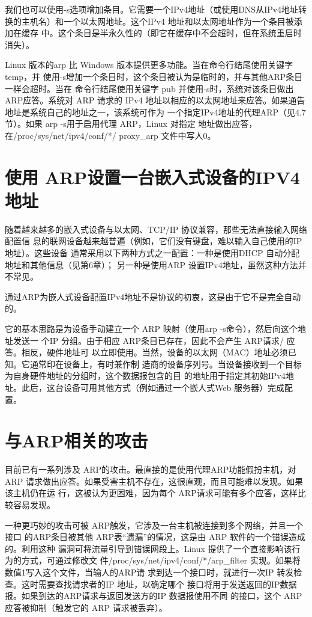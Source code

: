 我们也可以使用-s选项增加条目。它需要一个IPv4地址（或使用DNS从IPv4地址转
换的主机名）和一个以太网地址。这个IPv4 地址和以太网地址作为一个条目被添加在缓存
中。这个条目是半永久性的（即它在缓存中不会超时，但在系统重启时消失）。

Linux 版本的arp 比 Windows 版本提供更多功能。当在命令行结尾使用关键字 temp，并
使用-s增加一个条目时，这个条目被认为是临时的，并与其他ARP条目一样会超时。当在
命令行结尾使用关键字 pub 并使用-s时，系统对该条目做出 ARP应答。系统对 ARP 请求的
IPv4 地址以相应的以太网地址来应答。如果通告地址是系统自己的地址之一，该系统可作为
一个指定IPv4地址的代理ARP（见4.7节）。如果 arp -s用于启用代理 ARP，Linux 对指定
地址做出应答，在/proc/sys/net/ipv4/conf/*/ proxy\_arp 文件中写人0。

\section{使用 ARP设置一台嵌入式设备的IPV4 地址}

随着越来越多的嵌入式设备与以太网、TCP/IP 协议兼容，那些无法直接输入网络配置信
息的联网设备越来越普遍（例如，它们没有键盘，难以输入自己使用的IP地址）。这些设备
通常采用以下两种方式之一配置：一种是使用DHCP 自动分配地址和其他信息（见第6章）；
另一种是使用ARP 设置IPv4地址，虽然这种方法并不常见。

通过ARP为嵌人式设备配置IPv4地址不是协议的初衷，这是由于它不是完全自动的。

它的基本思路是为设备手动建立一个 ARP 映射（使用arp -s命令），然后向这个地址发送一
个IP 分组。由于相应 ARP条目已存在，因此不会产生 ARP请求/ 应答。相反，硬件地址可
以立即使用。当然，设备的以太网（MAC）地址必须已知。它通常印在设备上，有时兼作制
造商的设备序列号。当设备接收到一个目标为自身硬件地址的分组时，这个数据报包含的目
的地址用于指定其初始IPv4地址。此后，这台设备可用其他方式（例如通过一个嵌人式Web
服务器）完成配置。

\section{与ARP相关的攻击}

目前已有一系列涉及 ARP的攻击。最直接的是使用代理ARP功能假扮主机，对ARP
请求做出应答。如果受害主机不存在，这很直观，而且可能难以发现。如果该主机仍在运
行，这被认为更困难，因为每个 ARP请求可能有多个应答，这样比较容易发现。

一种更巧妙的攻击可被 ARP触发，它涉及一台主机被连接到多个网络，并且一个接口
的ARP条目被其他 ARP表“遗漏”的情况，这是由 ARP 软件的一个错误造成的。利用这种
漏洞可将流量引导到错误网段上。Linux 提供了一个直接影响该行为的方式，可通过修改文
件/proc/sys/net/ipv4/conf/*/arp\_filter 实现。如果将数值1写入这个文件，当输人的ARP请
求到达一个接口时，就进行一次IP 转发检查。这时需要查找请求者的IP 地址，以确定哪个
接口将用于发送返回的IP数据报。如果到达的ARP请求与返回发送方的IP 数据报使用不同
的接口，这个 ARP应答被抑制（触发它的 ARP 请求被丢弃）。

